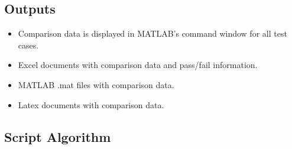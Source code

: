 \subsection{Outputs}
\begin{itemize}
    \item Comparison data is displayed in MATLAB's command window
    for all test cases.
    \item Excel documents with comparison data and pass/fail
    information.
    \item MATLAB .mat files with comparison data.
    \item Latex documents with comparison data.
\end{itemize}
\subsection{Script Algorithm}
